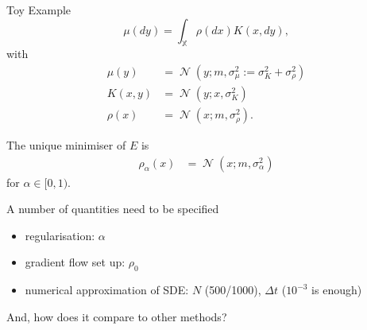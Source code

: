 \documentclass[aspectratio=149]{beamer}
\newcommand{\X}{\ensuremath{\mathbb{X}}}
\DeclareMathOperator{\N}{\mathcal{N}}
\begin{document}
\begin{frame}{Toy Example}
\begin{equation*}
\mu(dy) = \int_{\X} \rho(dx) K(x, dy), 
\end{equation*}
with 
\begin{align*}
\mu(y)&=\N(y;m,\sigma_{\mu}^{2}:=\sigma_{K}^{2}+\sigma_{\rho}^{2})\\
K(x,y)&=\N(y;x,\sigma_{K}^{2})\\
\rho(x)&=\N(x;m,\sigma_{\rho}^{2}).
\end{align*}

The unique minimiser of $E$ is
\begin{align*}
\rho_\alpha(x)&=\N(x;m,\sigma_{\alpha}^{2})
\end{align*}
for $\alpha\in[0, 1)$.
\end{frame}
\begin{frame}
A number of quantities need to be specified
\begin{itemize}
\item regularisation: $\alpha$
\item gradient flow set up: $\rho_0$
\item numerical approximation of SDE: $N$ (500/1000), $\Delta t$ ($10^{-3}$ is enough)
\end{itemize}

And, how does it compare to other methods?
\end{frame}
\end{document}
